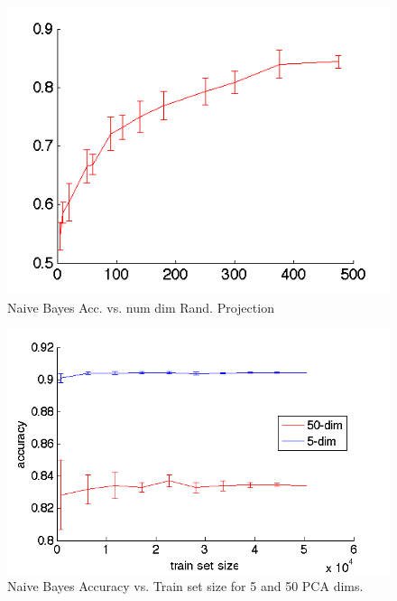\documentclass[]{article}
\begin{document}
\begin{center}
\begin{figure}[!ht]
\centering
\includegraphics[width=.5\textwidth]{../images/accuracy_vs_dim_randproj.png}
\caption{Naive Bayes Acc. vs. num dim Rand. Projection}
\label{fig:nb_rand_proj}
\end{figure}
\end{center}


\begin{center}
\begin{figure}[!ht]
\centering
\includegraphics[width=.5\textwidth]{../images/nb_5_vs_50.png}
\caption{Naive Bayes Accuracy vs. Train set size for 5 and 50 PCA dims.}
\label{fig:5_vs_50_pca}
\end{figure}
\end{center}
\end{document}
